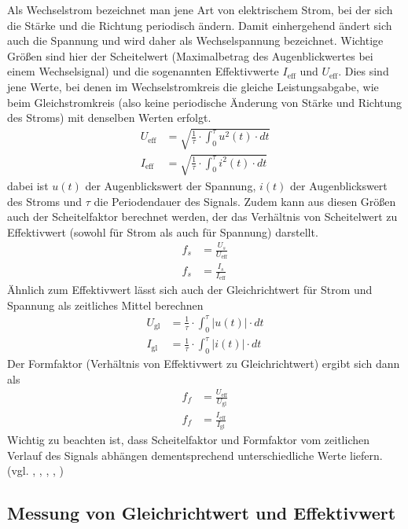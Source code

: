 \documentclass{article}
\begin{document}
Als Wechselstrom bezeichnet man jene Art von elektrischem Strom, bei der sich die Stärke und die Richtung periodisch ändern. Damit einhergehend ändert sich auch die Spannung und wird daher als Wechselspannung bezeichnet. Wichtige Größen sind hier der Scheitelwert (Maximalbetrag des Augenblickwertes bei einem Wechselsignal) und die sogenannten Effektivwerte $I_\text{eff}$ und $U_\text{eff}$. Dies sind jene Werte, bei denen im Wechselstromkreis die gleiche Leistungsabgabe, wie beim Gleichstromkreis (also keine periodische Änderung von Stärke und Richtung des Stroms) mit denselben Werten erfolgt.
\begin{align}
U_\text{eff} &= \sqrt{ \frac{1}{\tau}\cdot \int_0^\tau u^2(t)\cdot dt } \\ I_\text{eff} &= \sqrt{ \frac{1}{\tau}\cdot \int_0^\tau i^2(t)\cdot dt }
\end{align}
dabei ist $u(t)$ der Augenblickswert der Spannung, $i(t)$ der Augenblickswert des Stroms und $\tau$ die Periodendauer des Signals.
Zudem kann aus diesen Größen auch der Scheitelfaktor berechnet werden, der das Verhältnis von Scheitelwert zu Effektivwert (sowohl für Strom als auch für Spannung) darstellt.
\begin{align}
f_s &= \frac{U_s}{U_\text{eff}} \\
f_s &= \frac{I_s}{I_\text{eff}} 
\end{align}
Ähnlich zum Effektivwert lässt sich auch der Gleichrichtwert für Strom und Spannung als zeitliches Mittel berechnen
\begin{align}
U_\text{gl} &= \frac{1}{\tau}\cdot \int_0^\tau \left|u(t)\right|\cdot dt  \\ I_\text{gl} &= \frac{1}{\tau}\cdot \int_0^\tau \left|i(t)\right|\cdot dt 
\end{align}
Der Formfaktor (Verhältnis von Effektivwert zu Gleichrichtwert) ergibt sich dann als
\begin{align}
f_f &= \frac{U_\text{eff}}{U_\text{gl}} \\
f_f &= \frac{I_\text{eff}}{I_\text{gl}} 
\end{align}
Wichtig zu beachten ist, dass Scheitelfaktor und Formfaktor vom zeitlichen Verlauf des Signals abhängen dementsprechend unterschiedliche Werte liefern. (vgl. \cite{moodle}, \cite{src2}, \cite{src3}, \cite{src4}, \cite{src5})


\subsection{Messung von Gleichrichtwert und Effektivwert}
\end{document}
